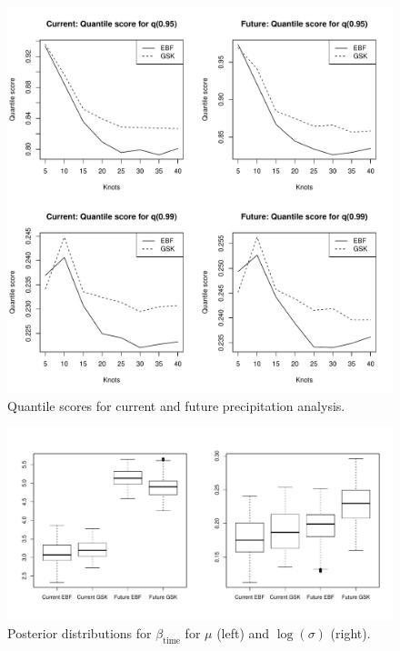 \documentclass[11pt]{article}
\begin{document}
\begin{figure}  %
  \centering
  \includegraphics[width=\linewidth]{plots/precip-qs.pdf}
  \caption{Quantile scores for current and future precipitation analysis.}
  \label{ebfig:precip-qs}
\end{figure}

\begin{figure}  %
  \centering
  \includegraphics[width=\linewidth]{plots/precip-post-time.pdf}
  \caption{Posterior distributions for $\beta_{\text{time}}$ for $\mu$ (left) and $\log(\sigma)$ (right).}
  \label{ebfig:precip-qs}
\end{figure}
\end{document}
